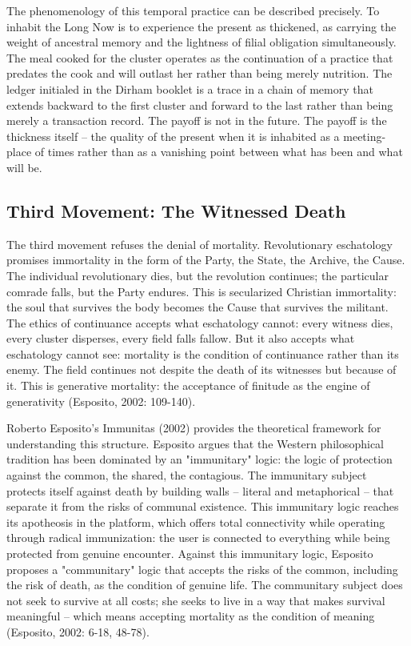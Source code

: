The phenomenology of this temporal practice can be described precisely. To inhabit the Long Now is to experience the present as thickened, as carrying the weight of ancestral memory and the lightness of filial obligation simultaneously. The meal cooked for the cluster operates as the continuation of a practice that predates the cook and will outlast her rather than being merely nutrition. The ledger initialed in the Dirham booklet is a trace in a chain of memory that extends backward to the first cluster and forward to the last rather than being merely a transaction record. The payoff is not in the future. The payoff is the thickness itself -- the quality of the present when it is inhabited as a meeting-place of times rather than as a vanishing point between what has been and what will be.

\subsection{Third Movement: The Witnessed Death}

The third movement refuses the denial of mortality. Revolutionary eschatology promises immortality in the form of the Party, the State, the Archive, the Cause. The individual revolutionary dies, but the revolution continues; the particular comrade falls, but the Party endures. This is secularized Christian immortality: the soul that survives the body becomes the Cause that survives the militant. The ethics of continuance accepts what eschatology cannot: every witness dies, every cluster disperses, every field falls fallow. But it also accepts what eschatology cannot see: mortality is the condition of continuance rather than its enemy. The field continues not despite the death of its witnesses but because of it. This is generative mortality: the acceptance of finitude as the engine of generativity (Esposito, 2002: 109-140).

Roberto Esposito's Immunitas (2002) provides the theoretical framework for understanding this structure. Esposito argues that the Western philosophical tradition has been dominated by an "immunitary" logic: the logic of protection against the common, the shared, the contagious. The immunitary subject protects itself against death by building walls -- literal and metaphorical -- that separate it from the risks of communal existence. This immunitary logic reaches its apotheosis in the platform, which offers total connectivity while operating through radical immunization: the user is connected to everything while being protected from genuine encounter. Against this immunitary logic, Esposito proposes a "communitary" logic that accepts the risks of the common, including the risk of death, as the condition of genuine life. The communitary subject does not seek to survive at all costs; she seeks to live in a way that makes survival meaningful -- which means accepting mortality as the condition of meaning (Esposito, 2002: 6-18, 48-78).

